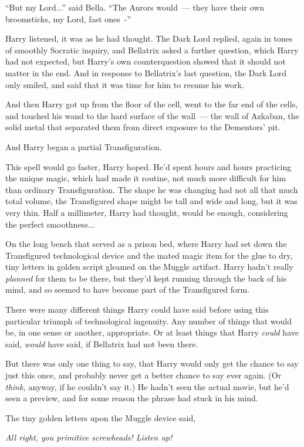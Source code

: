 ``But my Lord...'' said Bella. ``The Aurors would~--- they have their own broomsticks, my Lord, fast ones~-''

Harry listened, it was as he had thought. The Dark Lord replied, again in tones of smoothly Socratic inquiry, and Bellatrix asked a further question, which Harry had not expected, but Harry's own counterquestion showed that it should not matter in the end. And in response to Bellatrix's last question, the Dark Lord only smiled, and said that it was time for him to resume his work.

And then Harry got up from the floor of the cell, went to the far end of the cells, and touched his wand to the hard surface of the wall~--- the wall of Azkaban, the solid metal that separated them from direct exposure to the Dementors' pit.

And Harry began a partial Transfiguration.

This spell would go faster, Harry hoped. He'd spent hours and hours practicing the unique magic, which had made it routine, not much more difficult for him than ordinary Transfiguration. The shape he was changing had not all that much total volume, the Transfigured shape might be tall and wide and long, but it was very thin. Half a millimeter, Harry had thought, would be enough, considering the perfect smoothness...

On the long bench that served as a prison bed, where Harry had set down the Transfigured technological device and the mated magic item for the glue to dry, tiny letters in golden script gleamed on the Muggle artifact. Harry hadn't really \emph{planned} for them to be there, but they'd kept running through the back of his mind, and so seemed to have become part of the Transfigured form.

There were many different things Harry could have said before using this particular triumph of technological ingenuity. Any number of things that would be, in one sense or another, appropriate. Or at least things that Harry \emph{could} have said, \emph{would} have said, if Bellatrix had not been there.

But there was only one thing to say, that Harry would only get the chance to say just this once, and probably never get a better chance to say ever again. (Or \emph{think,} anyway, if he couldn't say it.) He hadn't seen the actual movie, but he'd seen a preview, and for some reason the phrase had stuck in his mind.

The tiny golden letters upon the Muggle device said,

\emph{All right, you primitive screwheads! Listen up!}
